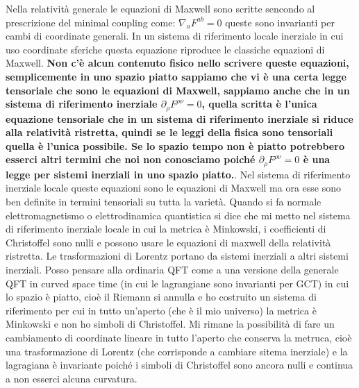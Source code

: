 \documentclass[10pt,a4paper]{article}
\begin{document}
\begin{itemize}
Nella relatività generale le equazioni di Maxwell sono scritte sencondo al prescrizione del minimal coupling come: $\nabla_{a} F^{a b} = 0$ queste sono invarianti per cambi di coordinate generali. In un sistema di riferimento locale inerziale in cui uso coordinate sferiche questa equazione riproduce le classiche equazioni di Maxwell. \textbf{Non c'è alcun contenuto fisico nello scrivere queste equazioni, semplicemente in uno spazio piatto sappiamo che vi è una certa legge tensoriale che sono le equazioni di Maxwell, sappiamo anche che in un sistema di riferimento inerziale $\partial_{\rho} F^{\rho \nu} = 0$, quella scritta è l'unica equazione tensoriale che in un sistema di riferimento inerziale si riduce alla relatività ristretta, quindi se le leggi della fisica sono tensoriali quella è l'unica possibile. Se lo spazio tempo non è piatto potrebbero esserci altri termini che noi non conosciamo poiché  $\partial_{\rho} F^{\rho \nu} = 0$ è una legge per sistemi inerziali in uno spazio piatto.}. Nel sistema di riferimento inerziale locale queste equazioni sono le equazioni di Maxwell ma ora esse sono ben definite in termini tensoriali su tutta la varietà. Quando si fa normale elettromagnetismo o elettrodinamica quantistica si dice che mi metto nel sistema di riferimento inerziale locale in cui la metrica è Minkowski, i coefficienti di Christoffel sono nulli e possono usare le equazioni di maxwell della relatività ristretta. Le trasformazioni di Lorentz portano da sistemi inerziali a altri sistemi inerziali.
Posso pensare alla ordinaria QFT come a una versione della generale QFT in curved space time (in cui le lagrangiane sono invarianti per GCT) in cui lo spazio è piatto, cioè il Riemann si annulla e ho costruito un sistema di riferimento per cui in tutto un'aperto (che è il mio universo) la metrica è Minkowski e non ho simboli di Christoffel. Mi rimane la possibilità di fare un cambiamento di coordinate lineare in tutto l'aperto che conserva la metruca, cioè una trasformazione di Lorentz (che corrisponde a cambiare sitema inerziale) e la lagragiana è invariante poiché i simboli di Christoffel sono ancora nulli e continua a non esserci alcuna curvatura.   
\end{itemize}
\end{document}
